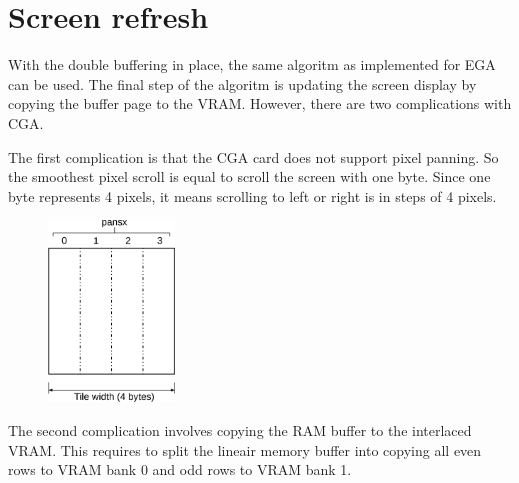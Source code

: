 \documentclass[book.tex]{subfiles}
\begin{document}
\section{Screen refresh}
With the double buffering in place, the same algoritm as implemented for EGA can be used. The final step of the algoritm is updating the screen display by copying the buffer page to the VRAM. However, there are two complications with CGA.\\

\par
The first complication is that the CGA card does not support pixel panning. So the smoothest pixel scroll is equal to scroll the screen with one byte. Since one byte represents 4 pixels, it means scrolling to left or right is in steps of 4 pixels.\\

\begin{figure}[H]
\centering
\includegraphics[width=0.3\textwidth]{imgs/drawings/CGA_Tile_Refresh.eps}
\label{fig:cga_tile_panning}
\end{figure}

\par
\begin{minipage}{\textwidth}
  
\end{minipage}
\label{state_type}
\par

The second complication involves copying the RAM buffer to the interlaced VRAM. This requires to split the lineair memory buffer into copying all even rows to VRAM bank 0 and odd rows to VRAM bank 1.\\
\end{document}

